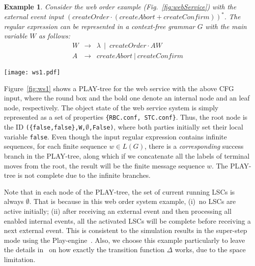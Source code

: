 \documentclass[]{llncs}
\newtheorem{Ex}{Example}
\begin{document}
\begin{Ex}
  Consider the web order example (Fig.~\ref{fig:webService}) with the
  external event input $(createOrder\cdot (createAbort + createConfirm))^{*}$.
  The regular expression can be represented in a context-free grammar $G$ with the main variable $W$ as follows:
  \begin{eqnarray*}
    W & \rightarrow & \lambda\ \mid\ createOrder\cdot AW \\
    A & \rightarrow & createAbort\ |\ createConfirm
  \end{eqnarray*}
\label{ex:webService1}
\end{Ex}


\begin{figure*}[htb]
	\centering
\texttt{[image: ws1.pdf]}\\
\caption{A PLAY-tree for the web order system in Example~\ref{ex:webService1}}
\label{fig:ws1}
\end{figure*}

\noindent
Figure~\ref{fig:ws1} shows a PLAY-tree for the web service with the above CFG input,
where the round box and the bold one denote an internal node and an leaf node, respectively.
The object state of the web service system is simply represented as a set of properties
{\tt \{RBC.conf, STC.conf\}}. Thus, the root node is the ID
{\tt (\{false,false\},W,$\emptyset$,False)}, where both parties initially
set their local variable {\tt false}.
Even though the input regular expression contains infinite sequences,
for each finite sequence $w \in L(G)$, there is a {\em corresponding} success branch in the
PLAY-tree, along which if we concatenate all the labels of terminal moves
from the root, the result will be the finite message sequence $w$.
The PLAY-tree is not complete due to the
infinite branches.

Note that in each node of the PLAY-tree, the set
of current running LSCs is always $\emptyset$. That is because in this web order system example,
(i)~no LSCs are active initially; (ii) after receiving an external event
and then processing all enabled internal events,
all the activated LSCs will be complete before receiving a next external event. This is consistent to the simulation results in the super-step mode
using the Play-engine~\cite{HM03}. Also, we choose this example particularly
to leave the details in~\cite{HM03} on how exactly the transition function $\Delta$ works, due to the space limitation.
\end{document}
